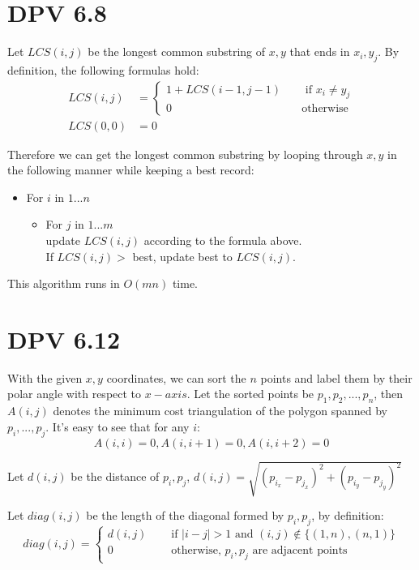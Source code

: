 \documentclass[twoside]{homework}
\begin{document}
\section{DPV 6.8}
Let $LCS(i, j)$ be the longest common substring of $x, y$ that ends in $x_i, y_j$. By definition, the following formulas hold:
	\begin{align*}
		LCS(i, j) &= \begin{cases}
			1 + LCS(i-1, j-1) &\quad \text{ if } x_i \neq y_j \\
			0 &\quad \text{otherwise}
		\end{cases} \\
		LCS(0, 0) &= 0
	\end{align*}

Therefore we can get the longest common substring by looping through $x, y$ in the following manner while keeping a best record:
	\begin{itemize}
		\item For $i$ in $1...n$
			\begin{itemize}
				\item For $j$ in $1...m$
				\\
					update $LCS(i, j)$ according to the formula above. \\
					If $LCS(i, j) > $ best, update best to $LCS(i, j)$.
			\end{itemize}
	\end{itemize}

This algorithm runs in $O(mn)$ time.

\section{DPV 6.12}
With the given $x, y$ coordinates, we can sort the $n$ points and label them by their polar angle with respect to $x-axis$. Let the sorted points be $p_1, p_2, ..., p_n$, then $A(i, j)$ denotes the minimum cost triangulation of the polygon spanned by $p_i, ..., p_j$. It's easy to see that for any $i$:
\[ A(i, i) = 0, A(i, i+1) = 0, A(i, i+2) = 0\]

Let $d(i, j)$ be the distance of $p_i, p_j$, $d(i, j) = \sqrt{(p_{i_x} - p_{j_x})^2 + (p_{i_y} - p_{j_y})^2}$

Let $diag(i, j)$ be the length of the diagonal formed by $p_i, p_j$, by definition:
\[ diag(i, j) = \begin{cases}
	d(i, j) &\quad \text{ if } |i - j| > 1 \text{ and } (i, j) \notin \{(1, n), (n, 1)\} \\
	0 &\quad \text{ otherwise, } p_i, p_j \text{ are adjacent points}
\end{cases}\]
\end{document}
